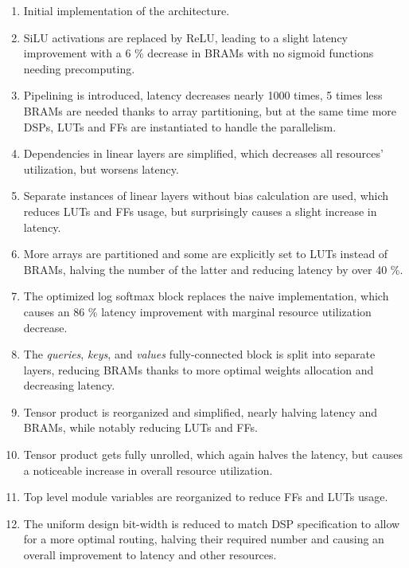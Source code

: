 \begin{enumerate}
  \item Initial implementation of the architecture.
  \item SiLU activations are replaced by ReLU, leading to a slight latency improvement with a 6 \% decrease in BRAMs with no sigmoid functions needing precomputing.
  \item Pipelining is introduced, latency decreases nearly 1000 times, 5 times less BRAMs are needed thanks to array partitioning, but at the same time more DSPs, LUTs and FFs are instantiated to handle the parallelism.
  \item Dependencies in linear layers are simplified, which decreases all resources' utilization, but worsens latency.
  \item Separate instances of linear layers without bias calculation are used, which reduces LUTs and FFs usage, but surprisingly causes a slight increase in latency.
  \item More arrays are partitioned and some are explicitly set to LUTs instead of BRAMs, halving the number of the latter and reducing latency by over 40 \%.
  \item The optimized log softmax block replaces the naive implementation, which causes an 86 \% latency improvement with marginal resource utilization decrease.
  \item The \textit{queries}, \textit{keys}, and \textit{values} fully-connected block is split into separate layers, reducing BRAMs thanks to more optimal weights allocation and decreasing latency.
  \item Tensor product is reorganized and simplified, nearly halving latency and BRAMs, while notably reducing LUTs and FFs.
  \item Tensor product gets fully unrolled, which again halves the latency, but causes a noticeable increase in overall resource utilization.
  \item Top level module variables are reorganized to reduce FFs and LUTs usage.
  \item The uniform design bit-width is reduced to match DSP specification to allow for a more optimal routing, halving their required number and causing an overall improvement to latency and other resources.
\end{enumerate}

